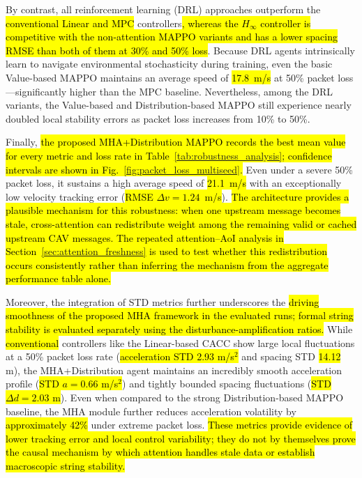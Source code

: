 \documentclass{ieeeaccess}
\begin{document}
By contrast, all reinforcement learning (DRL) approaches outperform the \hl{conventional Linear and MPC} controllers\hl{, whereas the $H_\infty$ controller is competitive with the non-attention MAPPO variants and has a lower spacing RMSE than both of them at 30\% and 50\% loss}. Because DRL agents intrinsically learn to navigate environmental stochasticity during training, even the basic Value-based MAPPO maintains an average speed of \hl{17.8~m/s} at 50\% packet loss—significantly higher than the MPC baseline. Nevertheless, among the DRL variants, the Value-based and Distribution-based MAPPO still experience nearly doubled local stability errors as packet loss increases from 10\% to 50\%.

Finally, \hl{the proposed MHA+Distribution MAPPO records the best mean value for every metric and loss rate in Table~\ref{tab:robustness_analysis}; confidence intervals are shown in Fig.~\ref{fig:packet_loss_multiseed}.} Even under a severe 50\% packet loss, it sustains a high average speed of \hl{21.1~m/s} with an exceptionally low velocity tracking error (\hl{RMSE $\Delta v = 1.24$~m/s}). \hl{The architecture provides a plausible mechanism for this robustness: when one upstream message becomes stale, cross-attention can redistribute weight among the remaining valid or cached upstream CAV messages. The repeated attention--AoI analysis in Section~\ref{sec:attention_freshness} is used to test whether this redistribution occurs consistently rather than inferring the mechanism from the aggregate performance table alone.} %

Moreover, the integration of STD metrics further underscores the \hl{driving smoothness of the proposed MHA framework in the evaluated runs; formal string stability is evaluated separately using the disturbance-amplification ratios.} While \hl{conventional} controllers like the Linear-based CACC show large local fluctuations at a 50\% packet loss rate (\hl{acceleration STD 2.93 m/s$^2$} and spacing STD \hl{14.12} m), the MHA+Distribution agent maintains an incredibly smooth acceleration profile (\hl{STD $a = 0.66$ m/s$^2$}) and tightly bounded spacing fluctuations (\hl{STD $\Delta d = 2.03$ m}). Even when compared to the strong Distribution-based MAPPO baseline, the MHA module further reduces acceleration volatility by \hl{approximately 42\%} under extreme packet loss. \hl{These metrics provide evidence of lower tracking error and local control variability; they do not by themselves prove the causal mechanism by which attention handles stale data or establish macroscopic string stability.} %
\end{document}
